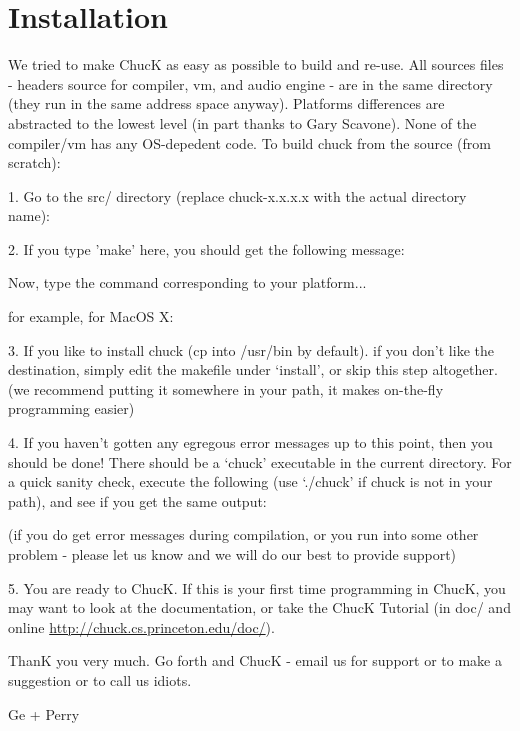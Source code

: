 \chapter{Installation}

We tried to make ChucK as easy as possible to build and re-use. All 
sources files - headers source for compiler, vm, and audio engine - are 
in the same directory (they run in the same address space anyway). Platforms 
differences are abstracted to the lowest level (in part thanks to Gary 
Scavone). None of the compiler/vm has any OS-depedent code. To build 
chuck from the source (from scratch): 


1. Go to the src/ directory (replace chuck-x.x.x.x with the actual 
directory name):



2. If you type 'make' here, you should get the following message:


Now, type the command corresponding to your platform... 

for example, for MacOS X:


3. If you like to install chuck (cp into /usr/bin by default). if you 
don't like the destination, simply edit the makefile under `install', or 
skip this step altogether. (we recommend putting it somewhere in your 
path, it makes on-the-fly programming easier)


4. If you haven't gotten any egregous error messages up to this point, 
then you should be done! There should be a `chuck' executable in the 
current directory. For a quick sanity check, execute the following (use 
`./chuck' if chuck is not in your path), and see if you get the same output:


(if you do get error messages during compilation, or you run into some 
other problem - please let us know and we will do our best to provide 
support) 

5. You are ready to ChucK. If this is your first time programming in 
ChucK, you may want to look at the documentation, or take the ChucK 
Tutorial (in doc/ and online 
\href{http://chuck.cs.princeton.edu/doc}{http://chuck.cs.princeton.edu/doc/}). 

ThanK you very much. Go forth and ChucK - email us for support or to make a 
suggestion or to call us idiots.

Ge + Perry
 
